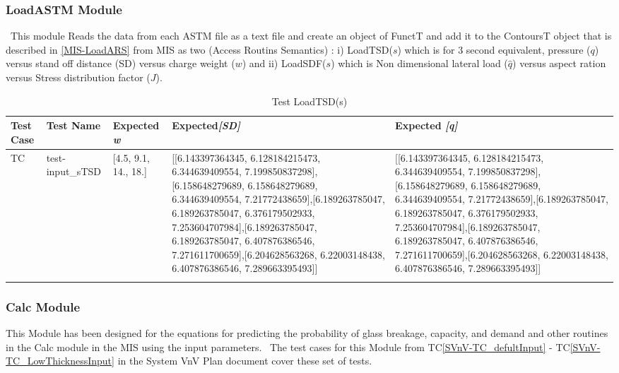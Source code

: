 \documentclass[12pt]{article}
\newcommand{\tcref}[1]{TC\ref{#1}}
\newcounter{utestnum} %
\begin{document}
\subsubsection{LoadASTM Module}	
	
~\newline This module Reads the data from each ASTM file as a text file and create an object of FunctT and add it to the ContoursT object that is described in \ref{MIS-LoadARS} from MIS as two (Access Routins Semantics) : i) LoadTSD($s$) which is for 3 second equivalent, 
pressure ($q$) versus stand off distance (SD) versus charge weight ($w$) and ii) LoadSDF($s$) which is Non dimensional lateral load ($\hat q$) versus aspect ration versus Stress
distribution factor ($J$). 


\begin{longtable}{  l  p{4cm} p{4cm}  p{6cm}  p{6cm}  }
	\hline
	\textbf{Test Case} & \textbf{Test Name} & \textbf{Expected \textit{w}} & \textbf{Expected\textit{[SD]}} & \textbf{Expected \textit{[q]}}\\ 
	\hline
	TC{utestnum}\theutestnum  \label{TC_TSD} & 	test-input\_sTSD &
	[4.5, 9.1, 14., 18.] &  [[6.143397364345, 6.128184215473, 6.344639409554, 7.199850837298],[6.158648279689, 6.158648279689, 6.344639409554, 7.21772438659],[6.189263785047, 6.189263785047, 6.376179502933, 7.253604707984],[6.189263785047, 6.189263785047, 6.407876386546, 7.271611700659],[6.204628563268, 6.22003148438, 6.407876386546, 7.289663395493]] & [[6.143397364345, 6.128184215473, 6.344639409554, 7.199850837298],[6.158648279689, 6.158648279689, 6.344639409554, 7.21772438659],[6.189263785047, 6.189263785047, 6.376179502933, 7.253604707984],[6.189263785047, 6.189263785047, 6.407876386546, 7.271611700659],[6.204628563268, 6.22003148438, 6.407876386546, 7.289663395493]]  \\                                                                                                                                                                 
	\hline
	\caption{Test LoadTSD(s)}
	\label{TSDTests}
\end{longtable}



\subsubsection{Calc Module}
	
This Module has been designed for the equations for predicting the probability of glass 
breakage, capacity, and demand and other routines in the Calc module in the MIS using the input parameters.
~\newline The test cases for this Module from \tcref{SVnV-TC_defultInput} - 
\tcref{SVnV-TC_LowThicknessInput} in the System VnV Plan document cover these set of tests. 
\end{document}
